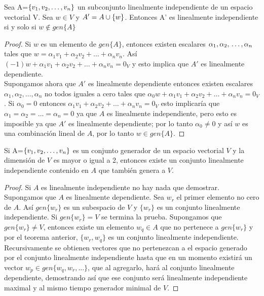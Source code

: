 \begin{theorem}
Sea A=$ \lbrace v_1, v_2, \ldots, v_n \rbrace$ un subconjunto linealmente independiente de un espacio vectorial V. Sea $w\in V$ y $A'=A\cup \left\{w \right\} $. Entonces A' es linealmente independiente si y solo si $ w \notin gen\{A\}$
\end{theorem}
 
\begin{proof}
Si $w$ es un elemento de $gen\{A\}$, entonces existen escalares $\alpha_1, \alpha_2,\\ \hdots, \alpha_n$ tales que $w=\alpha_1v_1+\alpha_2v_2+\hdots+\alpha_nv_n$. Así $(-1)w+\alpha_1v_1+\alpha_2v_2+\hdots+\alpha_nv_n=0_V$ y esto implica que $A'$ es linealmente dependiente.\\
Supongamos ahora que $A'$ es linealmente dependiente entonces existen escalares  $\alpha_1, \alpha_2, \hdots, \alpha_n$ no todos iguales a cero tales que $\alpha_0w+\alpha_1v_1+\alpha_2v_2+\hdots+\alpha_nv_n=0_V$. Si $\alpha_0=0$ entonces $\alpha_1v_1+\alpha_2v_2+\hdots+\alpha_nv_n=0_V$ esto implicaría que $\alpha_1= \alpha_2= \hdots=\alpha_n=0$ ya que $A$ es linealmente independiente, pero esto es imposible ya que $A'$ es linealmente dependiente; por lo tanto $\alpha_0\neq0$ y así $w$ es una combinación lineal de $A$, por lo tanto $w\in gen\{A\}$.
\end{proof}
\begin{theorem}
Si  A=$ \lbrace v_1, v_2, \ldots, v_n \rbrace$ es un conjunto generador de un espacio vectorial $V$ y la dimensión de $V$ es mayor o igual a 2, entonces existe un conjunto linealmente independiente contenido en $A$ que también genera a $V$.
\end{theorem}

\begin{proof}
Si $A$ es linealmente independiente no hay nada que demostrar. Supongamos que $A$ es linealmente dependiente. Sea $w_r$ el primer elemento no cero de $A$. Así $gen\{w_r\}$ es un subespacio de $V$ y $\{w_r\}$ es un conjunto linealmente independiente. Si $gen\{w_r\}=V$ se termina la prueba. Supongamos que $gen\{w_r\}\neq V$, entonces existe un elemento $w_q \in A$ que no pertenece a $gen\{w_r\}$ y por el teorema anterior, $\{w_r,w_q\}$ es un conjunto linealmente independiente. Recursivamente se obtienen vectores que no pertenezcan a el espacio generado por el conjunto linealmente independiente hasta que en un momento existirá un vector $w_p \in gen\{w_q,w_r, \hdots \}$, que al agregarlo, hará al conjunto linealmente dependiente, demostrando así que ese conjunto será linealmente independiente maximal y al mismo tiempo generador minimal de $V$.

\end{proof} 



